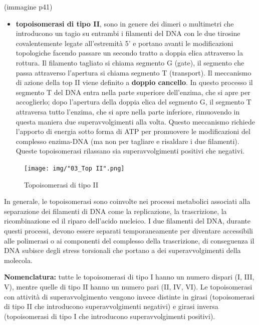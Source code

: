 \documentclass[11pt]{book}
\begin{document}
(immagine p41)

\begin{itemize}
\itemsep1pt\parskip0pt
\item
  \textbf{topoisomerasi di tipo II}, sono in genere dei dimeri o
  multimetri che introducono un tagio su entrambi i filamenti del DNA
  con le due tirosine covalentemente legate all'estremità 5' e portano
  avanti le modificazioni topologiche facendo passare un secondo tratto
  a doppia elica attraverso la rottura. Il filamento tagliato si chiama
  segmento G (gate), il segmento che passa attraverso l'apertura si
  chiama segmento T (transport). Il meccanismo di azione della top II
  viene definito a \textbf{doppio cancello}. In questo processo il
  segmento T del DNA entra nella parte superiore dell'enzima, che si
  apre per accoglierlo; dopo l'apertura della doppia elica del segmento
  G, il segmento T attraversa tutto l'enzima, che si apre nella parte
  inferiore, rimuovendo in questa maniera due superavvolgimenti alla
  volta. Questo meccanismo richiede l'apporto di energia sotto forma di
  ATP per promuovere le modificazioni del complesso enzima-DNA (ma non
  per tagliare e risaldare i due filamenti). Queste topoisomerasi
  rilassano sia superavvolgimenti positivi che negativi.
\end{itemize}

\begin{figure}[htp]
\centering
\texttt{[image: img/"03\_Top II".png]}
\caption{Topoisomerasi di tipo II}
\label{Top-II}
\end{figure}

In generale, le topoisomerasi sono coinvolte nei processi metabolici
associati alla separazione dei filamenti di DNA come la replicazione, la
trascrizione, la ricombinazione ed il riparo dell'acido nucleico. I due
filamenti del DNA, durante questi processi, devono essere separati
temporaneamente per diventare accessibili alle polimerasi o ai
componenti del complesso della trascrizione, di conseguenza il DNA
subisce degli stress torsionali che portano a dei superavvolgimenti
della molecola.

\textbf{Nomenclatura:} tutte le topoisomerasi di tipo I hanno un numero
dispari (I, III, V), mentre quelle di tipo II hanno un numero pari (II,
IV, VI). Le topoisomerasi con attività di superavvolgimento vengono
invece distinte in girasi (topoisomerasi di tipo II che introducono
superavvolgimenti negativi) e girasi inversa (topoisomerasi di tipo I
che introducono superavvolgimenti positivi).
\end{document}
